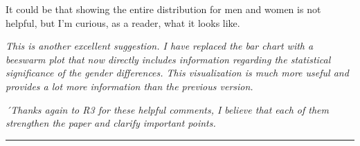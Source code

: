 It could be that showing the entire distribution for men and women is not helpful, but I’m curious, as a reader, what it looks like.

\textit{This is another excellent suggestion. I have replaced the bar chart with a beeswarm plot that now directly includes information regarding the statistical significance of the gender differences. This visualization is much more useful and provides a lot more information than the previous version.}

\textit{´Thanks again to R3 for these helpful comments, I believe that each of them strengthen the paper and clarify important points.}


\rule{\linewidth}{.01cm}